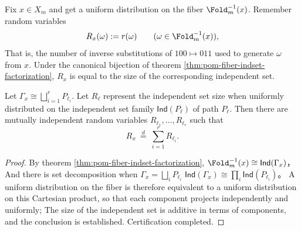 \begin{definition}\label{def:pom-fiber-rewrite-rv}
Fix \(x\in X_m\) and get a uniform distribution on the fiber \(\Fold_m^{-1}(x)\).
Remember random variables
\[
R_x(\omega):=r(\omega)\qquad(\omega\in\Fold_m^{-1}(x)),
\]
That is, the number of inverse substitutions of \(100\mapsto 011\) used to generate \(\omega\) from \(x\).
Under the canonical bijection of theorem \ref{thm:pom-fiber-indset-factorization}, \(R_x\) is equal to the size of the corresponding independent set.
\end{definition}

\begin{proposition}\label{prop:pom-fiber-rewrite-independent-sum}
Let \(\Gamma_x\cong\bigsqcup_{i=1}^r P_{\ell_i}\).
Let \(R_{\ell}\) represent the independent set size when uniformly distributed on the independent set family \(\mathsf{Ind}(P_{\ell})\) of path \(P_{\ell}\).
Then there are mutually independent random variables \(R_{\ell_1},\dots,R_{\ell_r}\) such that
\[
R_x\ \overset{d}{=}\ \sum_{i=1}^r R_{\ell_i}.
\]
\end{proposition}
\begin{proof}
By theorem \ref{thm:pom-fiber-indset-factorization},
\(
\Fold_m^{-1}(x)\cong \mathsf{Ind}(\Gamma_x)
\)，
And there is set decomposition when \(\Gamma_x=\bigsqcup_i P_{\ell_i}\)
\(
\mathsf{Ind}(\Gamma_x)\cong \prod_i \mathsf{Ind}(P_{\ell_i})
\)。
A uniform distribution on the fiber is therefore equivalent to a uniform distribution on this Cartesian product, so that each component projects independently and uniformly;
The size of the independent set is additive in terms of components, and the conclusion is established. Certification completed.
\end{proof}

